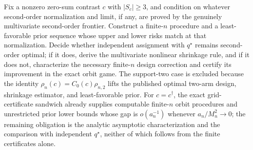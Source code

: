 Fix a nonzero zero-sum contrast \(c\) with \(|S_c|\geq3\), and condition on whatever second-order normalization and limit, if any, are proved by the genuinely multivariate second-order frontier. Construct a finite-\(n\) procedure and a least-favorable prior sequence whose upper and lower risks match at that normalization. Decide whether independent assignment with \(q^\star\) remains second-order optimal; if it does, derive the multivariate nonlinear shrinkage rule, and if it does not, characterize the necessary finite-\(n\) design correction and certify its improvement in the exact orbit game. The support-two case is excluded because the identity \(\rho_n(c)=C_0(c)\rho_{n,2}\) lifts the published optimal two-arm design, shrinkage estimator, and least-favorable prior. For \(c=c^\dagger\), the exact grid-certificate sandwich already supplies computable finite-\(n\) orbit procedures and unrestricted prior lower bounds whose gap is \(o(a_n^{-1})\) whenever \(a_n/M_n^2\to0\); the remaining obligation is the analytic asymptotic characterization and the comparison with independent \(q^\star\), neither of which follows from the finite certificates alone.